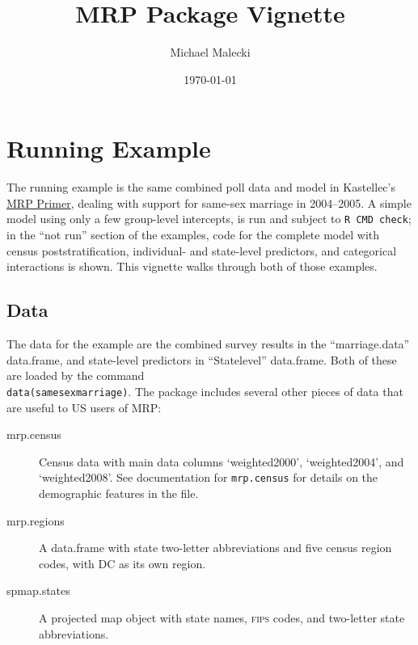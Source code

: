 \documentclass[11pt]{article} %
\title{MRP Package Vignette}
\author{Michael Malecki}
\date{\today}
\begin{document}
\maketitle
\thispagestyle{empty} %



\section{Running Example}
\label{sec:running-example}

\raggedright
\setlength{\parindent}{1em}

The running example is the same combined poll data and model in Kastellec's \href{http://www.princeton.edu/~jkastell/mrp_primer.html}{MRP Primer}, dealing with support for same-sex marriage in 2004--2005. A simple model using only a few group-level intercepts, is run and subject to \texttt{R CMD check}; in the “not run” section of the examples, code for the complete model with census poststratification, individual- and state-level predictors, and categorical interactions is shown. This vignette walks through both of those examples.

\subsection{Data}
\label{sec:data}

The data for the example are the combined survey results in the “marriage.data” data.frame, and state-level predictors in “Statelevel” data.frame. Both of these are loaded by the command\\ \texttt{data(samesexmarriage)}. The package includes several other pieces of data that are useful to US users of MRP:
\begin{description}
\item[mrp.census] Census data with main data columns `weighted2000', `weighted2004', and `weighted2008'. See documentation for \texttt{mrp.census} for details on the demographic features in the file.
\item[mrp.regions] A data.frame with state two-letter abbreviations and five census region codes, with DC as its own region.
\item[spmap.states] A projected map object with state names, \textsc{fips} codes, and two-letter state abbreviations.
\end{description}
\end{document}
